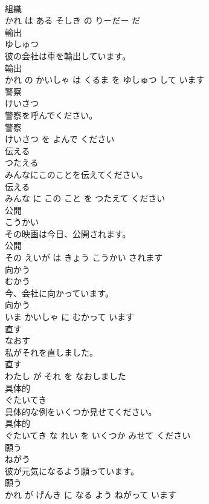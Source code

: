 \documentclass[8pt]{extreport}
\begin{document}
\begin{CJK}{UTF8}{min}
\\	組織 
\\	かれ は ある そしき の りーだー だ			
\\	輸出	
\\	ゆしゅつ			
\\	彼の会社は車を輸出しています。	
\\	輸出 
\\	かれ の かいしゃ は くるま を ゆしゅつ して います			
\\	警察	
\\	けいさつ			
\\	警察を呼んでください。	
\\	警察 
\\	けいさつ を よんで ください			
\\	伝える	
\\	つたえる			
\\	みんなにこのことを伝えてください。	
\\	伝える 
\\	みんな に この こと を つたえて ください			
\\	公開	
\\	こうかい			
\\	その映画は今日、公開されます。	
\\	公開 
\\	その えいが は きょう こうかい されます			
\\	向かう	
\\	むかう			
\\	今、会社に向かっています。	
\\	向かう 
\\	いま かいしゃ に むかって います			
\\	直す	
\\	なおす			
\\	私がそれを直しました。	
\\	直す 
\\	わたし が それ を なおしました			
\\	具体的	
\\	ぐたいてき			
\\	具体的な例をいくつか見せてください。	
\\	具体的 
\\	ぐたいてき な れい を いくつか みせて ください			
\\	願う	
\\	ねがう			
\\	彼が元気になるよう願っています。	
\\	願う 
\\	かれ が げんき に なる よう ねがって います			

\end{CJK}
\end{document}
